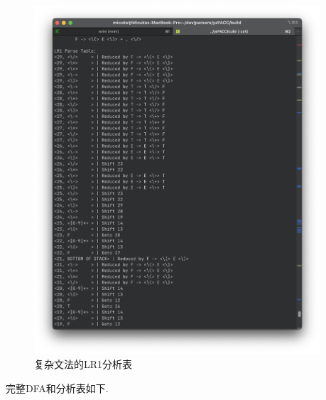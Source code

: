 \begin{figure}[ht!]
	\begin{center}
		\includegraphics[width=0.95\textwidth]{figures/lr1复杂分析表1.png}
	\end{center}
	\caption{复杂文法的LR1分析表}
	\label{fig:复杂文法的LR1分析表}
\end{figure}

完整DFA和分析表如下.

